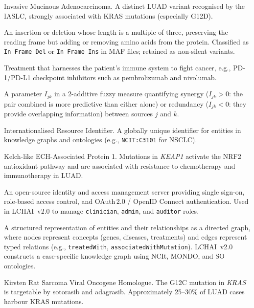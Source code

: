 \begin{description}[style=nextline,leftmargin=4cm]
\item[IMA] Invasive Mucinous Adenocarcinoma.  A distinct LUAD variant recognised by the IASLC, strongly associated with KRAS mutations (especially G12D).


\item[In-frame mutation] An insertion or deletion whose length is a multiple of three, preserving the reading frame but adding or removing amino acids from the protein.  Classified as \texttt{In\_Frame\_Del} or \texttt{In\_Frame\_Ins} in MAF files; retained as non-silent variants.


\item[Immunotherapy] Treatment that harnesses the patient's immune system to fight cancer, e.g., PD-1/PD-L1 checkpoint inhibitors such as pembrolizumab and nivolumab.


\item[Interaction index] A parameter $I_{jk}$ in a 2-additive fuzzy measure quantifying synergy ($I_{jk} > 0$: the pair combined is more predictive than either alone) or redundancy ($I_{jk} < 0$: they provide overlapping information) between sources $j$ and $k$.



\item[IRI] Internationalised Resource Identifier.  A globally unique identifier for entities in knowledge graphs and ontologies (e.g., \texttt{NCIT:C3101} for NSCLC).


\item[KEAP1] Kelch-like ECH-Associated Protein 1.  Mutations in \emph{KEAP1} activate the NRF2 antioxidant pathway and are associated with resistance to chemotherapy and immunotherapy in LUAD.


\item[Keycloak] An open-source identity and access management server providing single sign-on, role-based access control, and OAuth\,2.0 / OpenID Connect authentication.  Used in LCHAI~v2.0 to manage \texttt{clinician}, \texttt{admin}, and \texttt{auditor} roles.


\item[Knowledge graph] A structured representation of entities and their relationships as a directed graph, where nodes represent concepts (genes, diseases, treatments) and edges represent typed relations (e.g., \texttt{treatedWith}, \texttt{associatedWithMutation}).  LCHAI~v2.0 constructs a case-specific knowledge graph using NCIt, MONDO, and SO ontologies.


\item[KRAS] Kirsten Rat Sarcoma Viral Oncogene Homologue.  The G12C mutation in \emph{KRAS} is targetable by sotorasib and adagrasib.  Approximately 25--30\% of LUAD cases harbour KRAS mutations.



\end{description}
